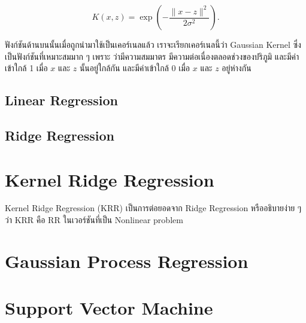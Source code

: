 \begin{equation}
    K(x,z) = \exp\left(-\frac{\lVert x - z \rVert^2}{2\sigma^2}\right).    
\end{equation}

\noindent ฟังก์ชันด้านบนนั้นเมื่อถูกนำมาใช้เป็นเคอร์เนลแล้ว เราจะเรียกเคอร์เนลนี้ว่า Gaussian Kernel ซึ่งเป็นฟังก์ชันที่เหมาะสมมาก ๆ เพราะ%
ว่ามีความสมมาตร มีความต่อเนื่องตลอดช่วงของปริภูมิ และมีค่าเข้าใกล้ 1 เมื่อ $x$ และ $z$ นั้นอยู่ใกล้กัน และมีค่าเข้าใกล้ 0 เมื่อ $x$ และ $z$ 
อยู่ห่างกัน

\subsection{Linear Regression}

\subsection{Ridge Regression}

\section{Kernel Ridge Regression}

Kernel Ridge Regression (KRR) เป็นการต่อยอดจาก Ridge Regression หรืออธิบายง่าย ๆ ว่า KRR คือ RR ในเวอร์ชันที่เป็น Nonlinear problem

\section{Gaussian Process Regression}

\section{Support Vector Machine}

